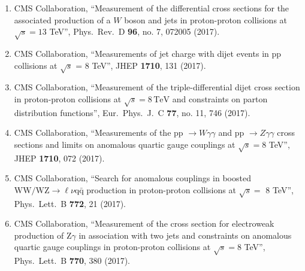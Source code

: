 \begin{itemize}
\begin{enumerate}
\item CMS Collaboration, ``Measurement of the differential cross sections for the associated production of a $W$ boson and jets in proton-proton collisions at $\sqrt{s}=13$ TeV'', Phys.\ Rev.\ D {\bf 96}, no. 7, 072005 (2017).

\item CMS Collaboration, ``Measurements of jet charge with dijet events in pp collisions at $\sqrt{s}$ = 8 TeV'', JHEP {\bf 1710}, 131 (2017).

\item CMS Collaboration, ``Measurement of the triple-differential dijet cross section in proton-proton collisions at $\sqrt{s}=8\,\text {TeV} $ and constraints on parton distribution functions'', Eur.\ Phys.\ J.\ C {\bf 77}, no. 11, 746 (2017).

\item CMS Collaboration, ``Measurements of the pp $\to W\gamma\gamma$ and pp $\to Z\gamma\gamma$ cross sections and limits on anomalous quartic gauge couplings at $ \sqrt{s}=8 $ TeV'', JHEP {\bf 1710}, 072 (2017).

\item CMS Collaboration, ``Search for anomalous couplings in boosted $\mathrm{ WW/WZ }\to\ell\nu\mathrm{ q \bar{q} }$ production in proton-proton collisions at $\sqrt{s} =$ 8 TeV'', Phys.\ Lett.\ B {\bf 772}, 21 (2017).

\item CMS Collaboration, ``Measurement of the cross section for electroweak production of Z$\gamma$ in association with two jets and constraints on anomalous quartic gauge couplings in proton-proton collisions at $\sqrt{s} = 8$ TeV'', Phys.\ Lett.\ B {\bf 770}, 380 (2017).


\end{enumerate}
\end{itemize}
